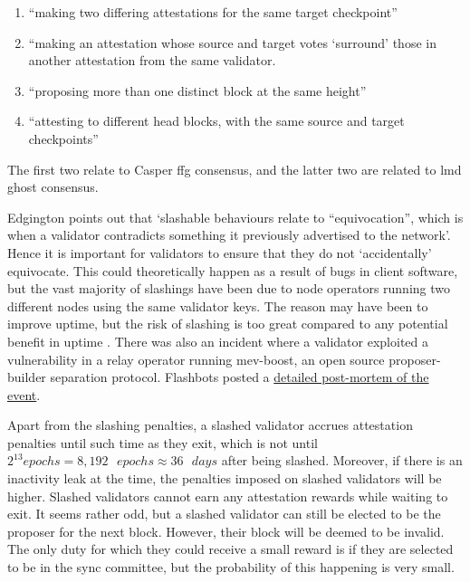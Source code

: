 \documentclass{article}
\begin{document}
\begin{enumerate}
  \item ``making two differing attestations for the same target checkpoint''
  \item ``making an attestation whose source and target votes `surround' those
    in another attestation from the same validator.
  \item ``proposing more than one distinct block at the same height''
  \item ``attesting to different head blocks, with the same source and target
    checkpoints''
\end{enumerate}

The first two relate to Casper \gls{ffg} consensus, and the latter two are
related to \gls{lmd} \gls{ghost} consensus.

Edgington points out that `slashable behaviours relate to ``equivocation'',
which is when a validator contradicts something it previously advertised to the
network'. Hence it is important for validators to ensure that they do not
`accidentally' equivocate. This could theoretically happen as a result of bugs
in client software, but the vast majority of slashings have been due to node
operators running two different nodes using the same validator keys. The reason
may have been to improve uptime, but the risk of slashing is too great compared
to any potential benefit in uptime \cite{Edgington2023}. There was also an
incident where a validator exploited a vulnerability in a relay operator
running mev-boost, an open source proposer-builder separation protocol.
Flashbots posted a 
\href{https://collective.flashbots.net/t/post-mortem-april-3rd-2023-mev-boost-relay-incident-and-related-timing-issue/1540}{detailed post-mortem of the event}.

Apart from the slashing penalties, a slashed validator accrues attestation
penalties until such time as they exit, which is not until $2^{13} \texttt{
}epochs = 8,192 \texttt{ }epochs \approx 36 \texttt{ } days$ after being
slashed. Moreover,  if there is an inactivity leak at the time, the penalties
imposed on slashed validators will be higher. Slashed validators cannot earn
any attestation rewards while waiting to exit. It seems rather odd, but a
slashed validator can still be elected to be the proposer for the next block.
However, their block will be deemed to be invalid. The only duty for which they
could receive a small reward is if they are selected to be in the sync
committee, but the probability of this happening is very small. 
\end{document}
